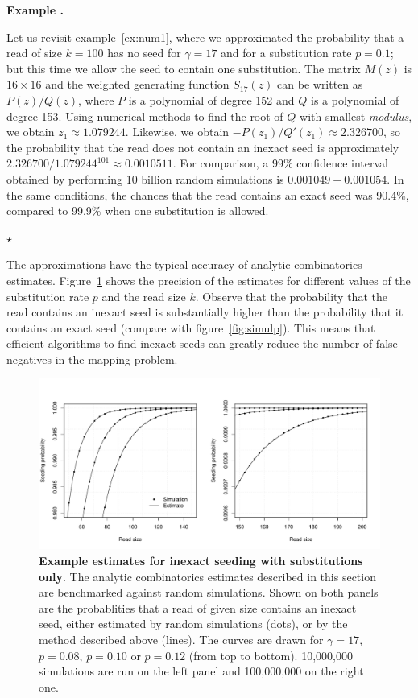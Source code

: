 \documentclass{article}
\newcounter{examplecounter}
\newenvironment{example}
{\small\vspace{0.5\baselineskip}
  \refstepcounter{examplecounter}%
  \noindent\textbf{Example \arabic{examplecounter}.}%
}{\vspace{-0.2\baselineskip}\begin{center}%
  $\star$\end{center}\vspace{0.5\baselineskip}}
\begin{document}
\begin{example}
Let us revisit example~\ref{ex:num1}, where we approximated the
probability that a read of size $k=100$ has no seed for $\gamma=17$ and
for a substitution rate $p=0.1$; but this time we allow the seed to
contain one substitution. The matrix $M(z)$ is $16\times16$ and the
weighted generating function $S_{17}(z)$ can be written as $P(z)/Q(z)$,
where $P$ is a polynomial of degree 152 and $Q$ is a polynomial of degree
153.  Using numerical methods to find the root of $Q$ with smallest
\textit{modulus}, we obtain $z_1 \approx 1.079244$. Likewise, we obtain
$-P(z_1)/Q'(z_1) \approx 2.326700$, so the probability that the read does
not contain an inexact seed is approximately $2.326700/1.079244^{101}
\approx 0.0010511$. For comparison, a 99\% confidence interval obtained by
performing 10 billion random simulations is $0.001049-0.001054$.
In the same conditions, the chances that the read contains an exact seed
was 90.4\%, compared to 99.9\% when one substitution is allowed.
\end{example}

The approximations have the typical accuracy of analytic combinatorics
estimates. Figure~\ref{fig:simulpinexact} shows the precision of the
estimates for different values of the substitution rate $p$ and the read
size $k$. Observe that the probability that the read contains an inexact
seed is substantially higher than the probability that it contains an
exact seed (compare with figure~\ref{fig:simulp}). This means that
efficient algorithms to find inexact seeds can greatly reduce the number
of false negatives in the mapping problem.


\begin{figure}[h]
\centering
\includegraphics[scale=0.445]{simulp-inexact.pdf}
\caption{\textbf{Example estimates for inexact seeding with substitutions
only}. The analytic combinatorics estimates described in this section
are benchmarked against random simulations.  Shown on both panels are the
probablities that a read of given size contains an inexact seed, either
estimated by random simulations (dots), or by the method described above
(lines). The curves are drawn for $\gamma=17$, $p=0.08$, $p=0.10$ or
$p=0.12$ (from top to bottom). 10,000,000 simulations are run on the left
panel and 100,000,000 on the right one.}
\label{fig:simulpinexact}
\end{figure}
\end{document}
